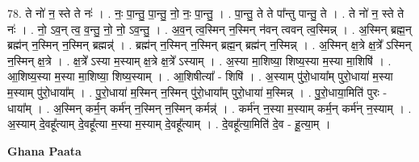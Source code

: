 \documentclass[17pt]{extarticle}
\begin{document}
78. ते नो॑ न॒ स्ते ते नः॑ । . नः॒ पा॒न्तु॒ पा॒न्तु॒ नो॒ नः॒ पा॒न्तु॒ । . पा॒न्तु॒ ते ते पा᳚न्तु पान्तु॒ ते । . ते नो॑ न॒ स्ते ते नः॑ । . नो॒ ऽव॒न् त्व॒ व॒न्तु॒ नो॒ नो॒ ऽव॒न्तु॒ । . अ॒व॒न् त्व॒स्मिन् न॒स्मिन् न॑वन् त्ववन् त्व॒स्मिन्न् । . अ॒स्मिन् ब्रह्म॒न् ब्रह्म॑न् न॒स्मिन् न॒स्मिन् ब्रह्मन्न्॑ । . ब्रह्म॑न् न॒स्मिन् न॒स्मिन् ब्रह्म॒न् ब्रह्म॑न् न॒स्मिन्न् । . अ॒स्मिन् क्ष॒त्रे क्ष॒त्रे᳚ ऽस्मिन् न॒स्मिन् क्ष॒त्रे । . क्ष॒त्रे᳚ ऽस्या म॒स्याम् क्ष॒त्रे क्ष॒त्रे᳚ ऽस्याम् । . अ॒स्या मा॒शिष्या॒ शिष्य॒स्या म॒स्या मा॒शिषि॑ । . आ॒शिष्य॒स्या म॒स्या मा॒शिष्या॒ शिष्य॒स्याम् । . आ॒शिषीत्या᳚ - शिषि॑ । . अ॒स्याम् पु॑रो॒धाया᳚म् पुरो॒धाया॑ म॒स्या म॒स्याम् पु॑रो॒धाया᳚म् । . पु॒रो॒धाया॑ म॒स्मिन् न॒स्मिन् पु॑रो॒धाया᳚म् पुरो॒धाया॑ म॒स्मिन्न् । . पु॒रो॒धाया॒मिति॑ पुरः - धाया᳚म् । . अ॒स्मिन् कर्म॒न् कर्म॑न् न॒स्मिन् न॒स्मिन् कर्मन्न्॑ । . कर्म॑न् न॒स्या म॒स्याम् कर्म॒न् कर्म॑न् न॒स्याम् । . अ॒स्याम् दे॒वहू᳚त्याम् दे॒वहू᳚त्या म॒स्या म॒स्याम् दे॒वहू᳚त्याम् । . दे॒वहू᳚त्या॒मिति॑ दे॒व - हू॒त्या॒म् । \newline

\textbf{Ghana Paata } \newline
\end{document}
